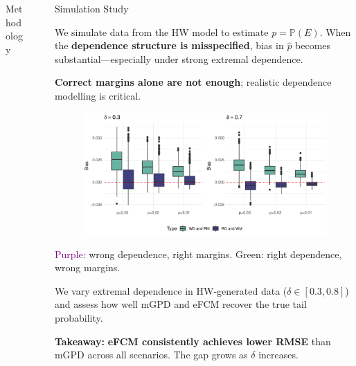 \documentclass[final]{beamer}
\newlength{\sepwidth}
\newlength{\colwidth}
\newcommand{\separatorcolumn}{\begin{column}{\sepwidth}\end{column}}
\begin{document}
\begin{frame}[t]
\begin{columns}[t]
\begin{column}{\colwidth}
\begin{block}{Methodology}
  \end{block}

\end{column}
  
\separatorcolumn

\begin{column}{\colwidth}

    \begin{block}{Simulation Study}
\vspace{-0.3cm}

We simulate data from the HW model to estimate \( p = \mathbb{P}(E) \). When the \textbf{dependence structure is misspecified}, bias in \(\hat{p}\) becomes substantial—especially under strong extremal dependence. 

\textbf{Correct margins alone are not enough}; realistic dependence modelling is critical.

\begin{figure}
  \centering
  \includegraphics[width=0.8\linewidth]{Figures/simu1_boxplot.pdf}
\end{figure}

\vspace{-5pt}
\textcolor{purple}{Purple:} wrong dependence, right margins. \quad  
\textcolor{green!60!black}{Green:} right dependence, wrong margins.

\vspace{-0.1cm}

We vary extremal dependence in HW-generated data (\(\delta \in [0.3, 0.8]\)) and assess how well mGPD and eFCM recover the true tail probability.

\vspace{0.3em}
\textbf{Takeaway:} \textbf{eFCM consistently achieves lower RMSE} than mGPD across all scenarios. The gap grows as \(\delta\) increases.


\end{block}
\end{column}
\end{columns}
\end{frame}
\end{document}
